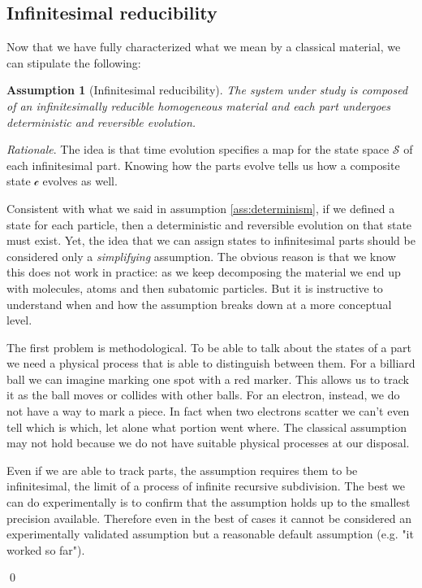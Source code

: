 \documentclass[aps,pra,10pt,twocolumn,floatfix,nofootinbib]{revtex4-1}
\numberwithin{equation}{section}
\newtheorem{assump}{Assumption}
\theoremstyle{definition}
\newenvironment{rationale}{\emph{Rationale}.}{\qed}
\begin{document}
\subsection{Infinitesimal reducibility}

Now that we have fully characterized what we mean by a classical material, we can stipulate the following:

\begin{assump}[Infinitesimal reducibility]\label{ass:infinitesimal_reducibility}
	The system under study is composed of an infinitesimally reducible homogeneous material and each part undergoes deterministic and reversible evolution.
\end{assump}

\begin{rationale}
	The idea is that time evolution specifies a map for the state space $\mathcal{S}$ of each infinitesimal part. Knowing how the parts evolve tells us how a composite state $\mathcal{c}$ evolves as well.
	
	Consistent with what we said in assumption \ref{ass:determinism}, if we defined a state for each particle, then a deterministic and reversible evolution on that state must exist. Yet, the idea that we can assign states to infinitesimal parts should be considered only a \emph{simplifying} assumption. The obvious reason is that we know this does not work in practice: as we keep decomposing the material we end up with molecules, atoms and then subatomic particles. But it is instructive to understand when and how the assumption breaks down at a more conceptual level.
	
	The first problem is methodological. To be able to talk about the states of a part we need a physical process that is able to distinguish between them. For a billiard ball we can imagine marking one spot with a red marker. This allows us to track it as the ball moves or collides with other balls. For an electron, instead, we do not have a way to mark a piece. In fact when two electrons scatter we can't even tell which is which, let alone what portion went where. The classical assumption may not hold because we do not have suitable physical processes at our disposal.
	
    Even if we are able to track parts, the assumption requires them to be infinitesimal, the limit of a process of infinite recursive subdivision. The best we can do experimentally is to confirm that the assumption holds up to the smallest precision available. Therefore even in the best of cases it cannot be considered an experimentally validated assumption but a reasonable default assumption (e.g. "it worked so far").
	

\end{rationale}
\end{document}

